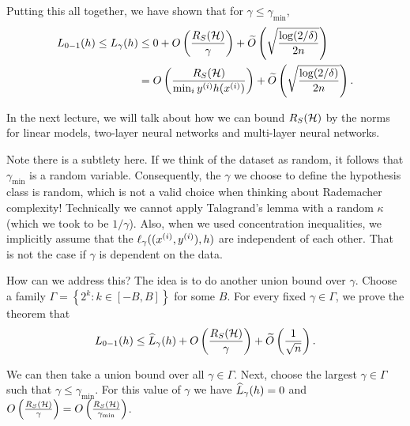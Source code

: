 Putting this all together, we have shown that for $\gamma \leq \gamma_{\min}$,
\begin{align}
L_{0-1}(h) \leq L_\gamma(h) &\leq 0 + O \left( \frac{R_S(\cH)}{\gamma} \right) + \tilO \left( \sqrt{\frac{\log (2 / \delta)}{2n}} \right) \\
&= O \left( \frac{R_S(\cH)}{\min_i y\sp{i} h(x\sp{i}) } \right) + \tilO \left( \sqrt{\frac{\log (2 / \delta)}{2n}} \right).
\end{align}

In the next lecture, we will talk about how we can bound $R_S(\cH)$ by the norms for linear models, two-layer neural networks and multi-layer neural networks.

\begin{remark}
Note there is a subtlety here. If we think of the dataset as random, it follows that $\gamma_{\min}$ is a random variable. Consequently, the $\gamma$ we choose to define the hypothesis class is random, which is not a valid choice when thinking about Rademacher complexity! Technically we cannot apply Talagrand's lemma with a random $\kappa$ (which we took to be $1/\gamma$). Also, when we used concentration inequalities, we implicitly assume that the $\ell_\gamma((x\sp{i}, y\sp{i}), h)$ are independent of each other. That is not the case if $\gamma$ is dependent on the data.

How can we address this? The idea is to do another union bound over $\gamma$. Choose a family $\Gamma = \left\{ 2^k: k \in [-B, B] \right\}$ for some $B$. For every fixed $\gamma \in \Gamma$, we prove the theorem that
\begin{align}
L_{0-1}(h) \leq \hatL_\gamma (h) + O \left( \frac{R_S(\cH)}{\gamma} \right) + \tilO \left( \frac{1}{\sqrt{n}} \right).
\end{align}
\end{remark}

We can then take a union bound over all $\gamma \in \Gamma$. Next, choose the largest $\gamma \in \Gamma$ such that $\gamma \leq \gamma_{\min}$. For this value of $\gamma$ we have $\hatL_\gamma (h) = 0$ and $O \left( \frac{R_S(\cH)}{\gamma} \right) = O \left( \frac{R_S(\cH)}{\gamma_{\min}} \right)$.